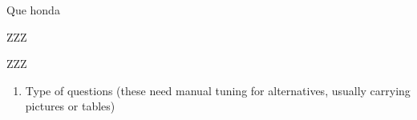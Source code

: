 \documentclass{article}
\begin{document}
Que honda

ZZZ \par ZZZ

\begin{enumerate}
\item Type of questions (these need manual tuning for alternatives,
      usually carrying pictures or tables)

 \begin{myfakelist}
 \end{myfakelist}
 
\end{enumerate}
\end{document}
